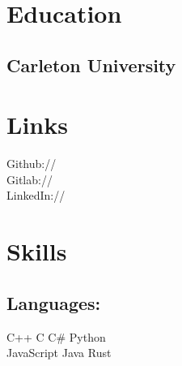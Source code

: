 \documentclass[]{deedy-resume-openfont}
\begin{document}
\vspace*{10pt}


%
%

\begin{minipage}[t]{0.33\textwidth}

\section{Education}

\subsection{Carleton University}
\sectionsep

\section{Links}

\sectionsep

Github:// \href{https://github.com/AngelOnFira}{}\\

Gitlab:// \href{https://gitlab.com/AngelOnFira}{}\\

LinkedIn://  \href{https://www.linkedin.com/in/forest-anderson}{}

\sectionsep

\section{Skills}

\subsection{Languages:}
\sectionsep

C++ \textbullet{} C \textbullet{} C\# \textbullet{} Python\\

JavaScript \textbullet{} Java \textbullet{} Rust\\


\end{minipage}
\end{document}

